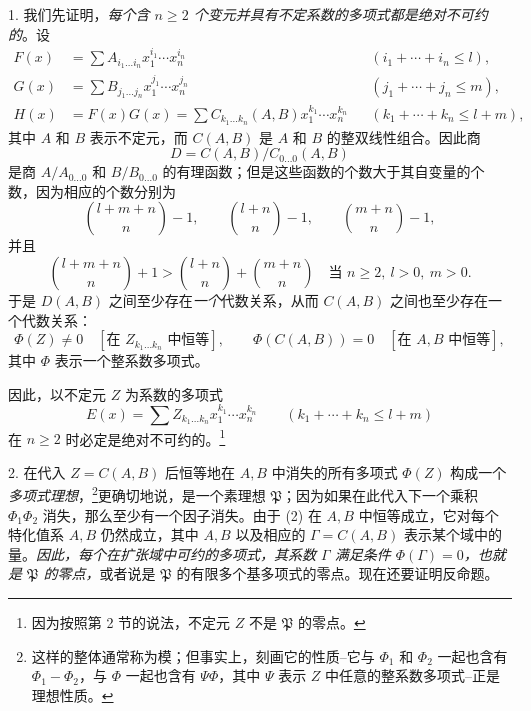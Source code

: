 1. 我们先证明，\emph{每个含 $n\ge2$ 个变元并具有不定系数的多项式都是绝对不可约的}。设
\begin{equation}
\begin{aligned}
F(x)&=\sum A_{i_1\ldots i_n}x_1^{i_1}\cdots x_n^{i_n} &&(i_1+\cdots+i_n\le l),\\
G(x)&=\sum B_{j_1\ldots j_n}x_1^{j_1}\cdots x_n^{j_n} &&(j_1+\cdots+j_n\le m),\\
H(x)&=F(x)G(x)=\sum C_{k_1\ldots k_n}(A,B)x_1^{k_1}\cdots x_n^{k_n} &&(k_1+\cdots+k_n\le l+m),
\end{aligned}
\tag{1}
\end{equation}
其中 $A$ 和 $B$ 表示不定元，而 $C(A,B)$ 是 $A$ 和 $B$ 的整双线性组合。因此商
\[
D=C(A,B)/C_{0\ldots0}(A,B)
\]
是商 $A/A_{0\ldots0}$ 和 $B/B_{0\ldots0}$ 的有理函数；但是这些函数的个数大于其自变量的个数，因为相应的个数分别为
\[
\binom{l+m+n}{n}-1,
\qquad
\binom{l+n}{n}-1,
\qquad
\binom{m+n}{n}-1,
\]
并且
\[
\binom{l+m+n}{n}+1>
\binom{l+n}{n}+\binom{m+n}{n}
\quad\text{当 } n\ge2,\ l>0,\ m>0.
\]
于是 $D(A,B)$ 之间至少存在\emph{一个}代数关系，从而 $C(A,B)$ 之间也至少存在一个代数关系：
\begin{equation}
 \Phi(Z)\ne0\quad[\text{在 }Z_{k_1\ldots k_n}\text{ 中恒等}],
 \qquad
 \Phi(C(A,B))=0\quad[\text{在 }A,B\text{ 中恒等}],
\tag{2}
\end{equation}
其中 $\Phi$ 表示一个整系数多项式。

因此，以不定元 $Z$ 为系数的多项式
\begin{equation}
 E(x)=\sum Z_{k_1\ldots k_n}x_1^{k_1}\cdots x_n^{k_n}
 \qquad(k_1+\cdots+k_n\le l+m)
\tag{3}
\end{equation}
在 $n\ge2$ 时必定是绝对不可约的。\footnote{因为按照第 2 节的说法，不定元 $Z$ 不是 $\mathfrak P$ 的零点。}

2. 在代入 $Z=C(A,B)$ 后恒等地在 $A,B$ 中消失的所有多项式 $\Phi(Z)$ 构成一个\emph{多项式理想}，\footnote{这样的整体通常称为模；但事实上，刻画它的性质--它与 $\Phi_1$ 和 $\Phi_2$ 一起也含有 $\Phi_1-\Phi_2$，与 $\Phi$ 一起也含有 $\Psi\Phi$，其中 $\Psi$ 表示 $Z$ 中任意的整系数多项式--正是理想性质。}更确切地说，是一个素理想 $\mathfrak P$；因为如果在此代入下一个乘积 $\Phi_1\Phi_2$ 消失，那么至少有一个因子消失。由于 (2) 在 $A,B$ 中恒等成立，它对每个特化值系 $A,B$ 仍然成立，其中 $A,B$ 以及相应的 $\Gamma=C(A,B)$ 表示某个域中的量。\emph{因此，每个在扩张域中可约的多项式，其系数 $\Gamma$ 满足条件 $\Phi(\Gamma)=0$，也就是 $\mathfrak P$ 的零点，}或者说是 $\mathfrak P$ 的有限多个基多项式的零点。现在还要证明反命题。

